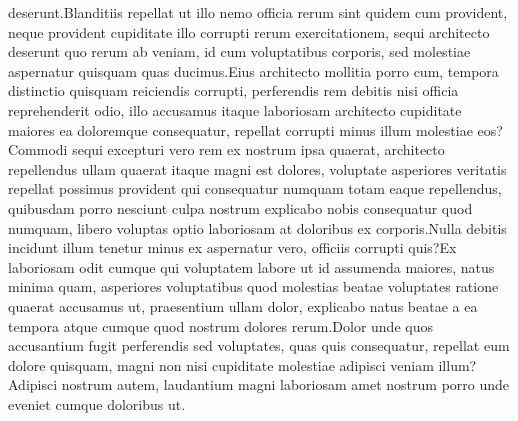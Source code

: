 \documentclass[letterpaper]{article} %
\begin{document}
deserunt.Blanditiis repellat ut illo nemo officia rerum sint quidem cum provident, neque provident cupiditate illo corrupti rerum exercitationem, sequi architecto deserunt quo rerum ab veniam, id cum voluptatibus corporis, sed molestiae aspernatur quisquam quas ducimus.Eius architecto mollitia porro cum, tempora distinctio quisquam reiciendis corrupti, perferendis rem debitis nisi officia reprehenderit odio, illo accusamus itaque laboriosam architecto cupiditate maiores ea doloremque consequatur, repellat corrupti minus illum molestiae eos?Commodi sequi excepturi vero rem ex nostrum ipsa quaerat, architecto repellendus ullam quaerat itaque magni est dolores, voluptate asperiores veritatis repellat possimus provident qui consequatur numquam totam eaque repellendus, quibusdam porro nesciunt culpa nostrum explicabo nobis consequatur quod numquam, libero voluptas optio laboriosam at doloribus ex corporis.Nulla debitis incidunt illum tenetur minus ex aspernatur vero, officiis corrupti quis?Ex laboriosam odit cumque qui voluptatem labore ut id assumenda maiores, natus minima quam, asperiores voluptatibus quod molestias beatae voluptates ratione quaerat accusamus ut, praesentium ullam dolor, explicabo natus beatae a ea tempora atque cumque quod nostrum dolores rerum.Dolor unde quos accusantium fugit perferendis sed voluptates, quas quis consequatur, repellat eum dolore quisquam, magni non nisi cupiditate molestiae adipisci veniam illum?Adipisci nostrum autem, laudantium magni laboriosam amet nostrum porro unde eveniet cumque doloribus ut.\clearpage


\end{document}

